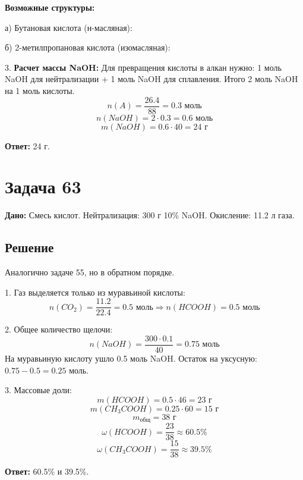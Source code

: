 \documentclass[12pt]{article}
\begin{document}
	\textbf{Возможные структуры:}
	
	а) Бутановая кислота (н-масляная):
	
	б) 2-метилпропановая кислота (изомасляная):
	
	3. \textbf{Расчет массы NaOH:}
	Для превращения кислоты в алкан нужно: 1 моль NaOH для нейтрализации + 1 моль NaOH для сплавления. Итого 2 моль NaOH на 1 моль кислоты.
	$$ n(A) = \frac{26.4}{88} = 0.3 \text{ моль} $$
	$$ n(NaOH) = 2 \cdot 0.3 = 0.6 \text{ моль} $$
	$$ m(NaOH) = 0.6 \cdot 40 = 24 \text{ г} $$
	
	\textbf{Ответ:} 24 г.
	
	\hrulefill
	
	\section*{Задача 63}
	
	\textbf{Дано:} Смесь кислот. Нейтрализация: 300 г 10\% NaOH. Окисление: 11.2 л газа.
	
	\subsection*{Решение}
	
	Аналогично задаче 55, но в обратном порядке.
	
	1. Газ выделяется только из муравьиной кислоты:
	$$ n(CO_2) = \frac{11.2}{22.4} = 0.5 \text{ моль} \Rightarrow n(HCOOH) = 0.5 \text{ моль} $$
	
	2. Общее количество щелочи:
	$$ n(NaOH) = \frac{300 \cdot 0.1}{40} = 0.75 \text{ моль} $$
	На муравьиную кислоту ушло 0.5 моль NaOH.
	Остаток на уксусную: $0.75 - 0.5 = 0.25$ моль.
	
	3. Массовые доли:
	$$ m(HCOOH) = 0.5 \cdot 46 = 23 \text{ г} $$
	$$ m(CH_3COOH) = 0.25 \cdot 60 = 15 \text{ г} $$
	$$ m_{\text{общ}} = 38 \text{ г} $$
	$$ \omega(HCOOH) = \frac{23}{38} \approx 60.5\% $$
	$$ \omega(CH_3COOH) = \frac{15}{38} \approx 39.5\% $$
	
	\textbf{Ответ:} 60.5\% и 39.5\%.
\end{document}
